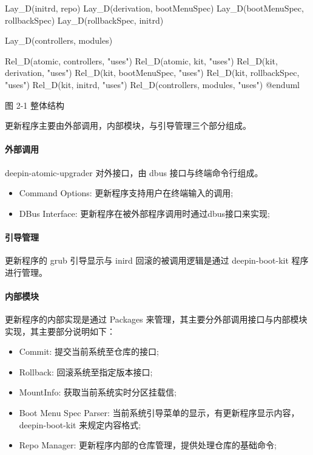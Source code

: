 \documentclass{utart}
\begin{document}
\begin{center}
\begin{adjustbox}{scale=0.75}
\begin{plantuml}
{{          Lay_D(initrd, repo)
          Lay_D(derivation, bootMenuSpec)
          Lay_D(bootMenuSpec, rollbackSpec)
          Lay_D(rollbackSpec, initrd)
        }

        Lay_D(controllers, modules)
      }

      Rel_D(atomic, controllers, "uses")
      Rel_D(atomic, kit, "uses")
      Rel_D(kit, derivation, "uses")
      Rel_D(kit, bootMenuSpec, "uses")
      Rel_D(kit, rollbackSpec, "uses")
      Rel_D(kit, initrd, "uses")
      Rel_D(controllers, modules, "uses")
      @enduml
    \end{plantuml}
  \end{adjustbox}

  图 2-1 整体结构
\end{center}

更新程序主要由外部调用，内部模块，与引导管理三个部分组成。

\paragraph{外部调用}
deepin-atomic-upgrader 对外接口，由 dbus 接口与终端命令行组成。
\begin{itemize}[leftmargin=4em]
  \item Command Options: 更新程序支持用户在终端输入的调用;
  \item DBus Interface: 更新程序在被外部程序调用时通过dbus接口来实现;
\end{itemize}

\paragraph{引导管理}

更新程序的 grub 引导显示与 inird 回滚的被调用逻辑是通过 deepin-boot-kit 程序进行管理。

\paragraph{内部模块}
更新程序的内部实现是通过 Packages 来管理，其主要分外部调用接口与内部模块实现，其主要部分说明如下：

\begin{itemize}[leftmargin=4em]
  \item Commit: 提交当前系统至仓库的接口;
  \item Rollback: 回滚系统至指定版本接口;
  \item MountInfo: 获取当前系统实时分区挂载信;
  \item Boot Menu Spec Parser: 当前系统引导菜单的显示，有更新程序显示内容，deepin-boot-kit 来规定内容格式;
  \item Repo Manager: 更新程序内部的仓库管理，提供处理仓库的基础命令;
\end{itemize}
\end{document}
